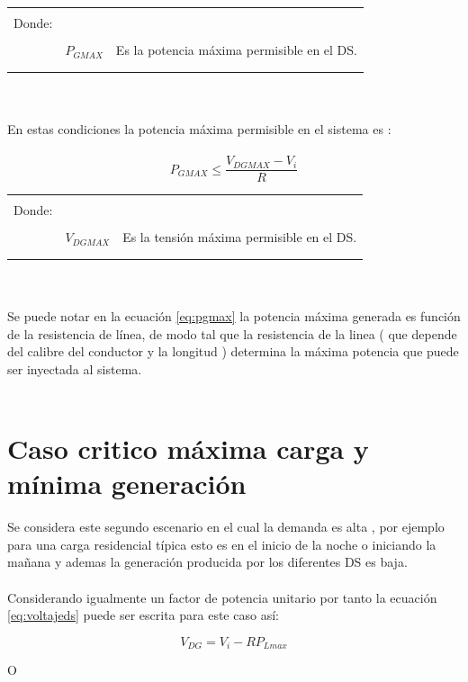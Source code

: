 \documentclass[12pt, letterpaper]{report}
\begin{document}
\begin{tabular}{l c r}
    & &\\
    Donde:& & \\
    & &\\
    & $P_{GMAX}$ & Es la potencia máxima permisible en el DS.\\
    & &\\
    & &\\
\end{tabular}\\\\
En estas condiciones la potencia máxima permisible en el sistema es :\\\\
\begin{equation}
P_{GMAX} \leq \frac{V_{DGMAX} - V_{i}}{R}
\label{eq:pgmax}
\end{equation}
\begin{tabular}{l c r}
    & &\\
    Donde:& & \\
    & &\\
    & $V_{DGMAX}$ & Es la tensión máxima permisible en el DS.\\
    & &\\
    & &\\
\end{tabular}\\\\
Se puede notar en la ecuación \ref{eq:pgmax} la potencia máxima generada es función de la resistencia de línea, de modo tal que la resistencia de la linea ( que depende del calibre del conductor y la longitud ) determina la máxima potencia que puede ser inyectada al sistema.\\\\
\section{Caso critico máxima carga y mínima generación }
Se considera este segundo escenario en el cual la demanda es alta , por ejemplo  para una carga residencial típica  esto es  en el inicio de la noche o iniciando la mañana y ademas la generación producida por los diferentes DS es baja.\\\\
Considerando igualmente un factor de potencia unitario por tanto la ecuación \ref{eq:voltajeds} puede ser  escrita para este caso así:

\[V_{DG} = V_{i} - RP_{Lmax}\]

O
\end{document}
